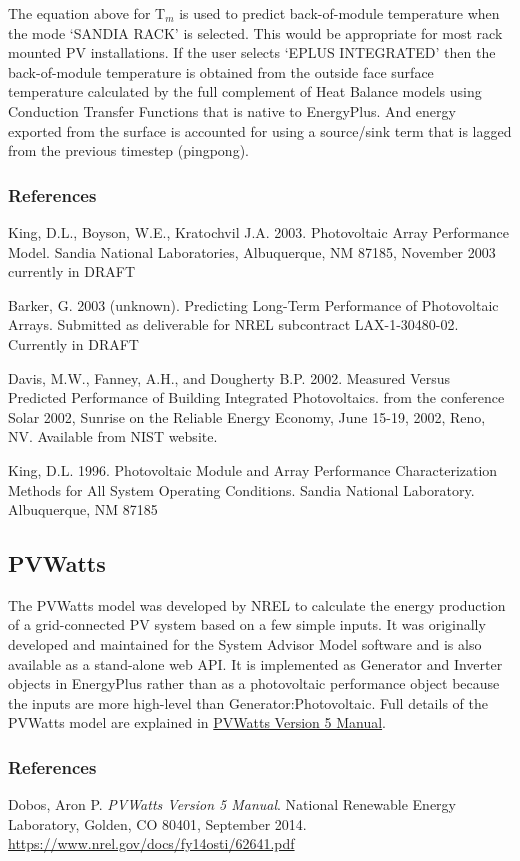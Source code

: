 The equation above for T\(_{m}\) is used to predict back-of-module temperature when the mode `SANDIA RACK' is selected. This would be appropriate for most rack mounted PV installations. If the user selects `EPLUS INTEGRATED' then the back-of-module temperature is obtained from the outside face surface temperature calculated by the full complement of Heat Balance models using Conduction Transfer Functions that is native to EnergyPlus. And energy exported from the surface is accounted for using a source/sink term that is lagged from the previous timestep (pingpong).

\subsubsection{References}\label{references-1-014}

King, D.L., Boyson, W.E., Kratochvil J.A. 2003. Photovoltaic Array Performance Model. Sandia National Laboratories, Albuquerque, NM 87185, November 2003~ currently in DRAFT

Barker, G. 2003 (unknown). Predicting Long-Term Performance of Photovoltaic Arrays. Submitted as deliverable for NREL subcontract LAX-1-30480-02. Currently in DRAFT

Davis, M.W., Fanney, A.H., and Dougherty B.P. 2002. Measured Versus Predicted Performance of Building Integrated Photovoltaics. from the conference Solar 2002, Sunrise on the Reliable Energy Economy, June 15-19, 2002, Reno, NV. Available from NIST website.

King, D.L. 1996. Photovoltaic Module and Array Performance Characterization Methods for All System Operating Conditions. Sandia National Laboratory. Albuquerque, NM 87185

\subsection{PVWatts}\label{pvwattsgenerator}

The PVWatts model was developed by NREL to calculate the energy production of a grid-connected PV system based on a few simple inputs. It was originally developed and maintained for the System Advisor Model software and is also available as a stand-alone web API. It is implemented as Generator and Inverter objects in EnergyPlus rather than as a photovoltaic performance object because the inputs are more high-level than Generator:Photovoltaic. Full details of the PVWatts model are explained in \href{https://www.nrel.gov/docs/fy14osti/62641.pdf}{PVWatts Version 5 Manual}.

\subsubsection{References}\label{references-pvwatts}

Dobos, Aron P. \textit{PVWatts Version 5 Manual}. National Renewable Energy Laboratory, Golden, CO 80401, September 2014. \url{https://www.nrel.gov/docs/fy14osti/62641.pdf}
